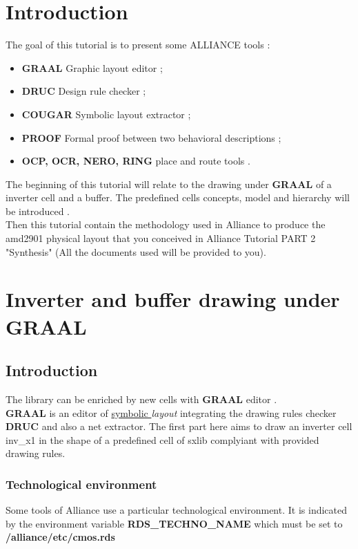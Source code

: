 \documentclass{article}
\begin{document}
\newpage

\section{Introduction}
 The goal of this tutorial is to present some ALLIANCE tools :
\begin{itemize}\itemsep=-.4ex
\item   {\bf GRAAL} Graphic layout editor ;
\item   {\bf DRUC} Design rule checker ;
\item   {\bf COUGAR} Symbolic layout extractor ;
\item   {\bf PROOF} Formal proof between two behavioral descriptions ;
\item   {\bf OCP, OCR, NERO, RING} place and route tools .
\end{itemize}

The beginning of this tutorial will relate to the drawing under {
\bf GRAAL } of a inverter cell and a buffer.
The predefined cells concepts, model and
hierarchy will be introduced .\\
Then this tutorial contain the methodology used in Alliance to produce
the amd2901 physical layout that you conceived in Alliance Tutorial 
PART 2 "Synthesis" (All the documents used will be provided to you).
 
\newpage

\section{Inverter and buffer drawing under GRAAL}

\subsection{Introduction}
    The library can be enriched by new cells with {\bf GRAAL} editor .\\
{ \bf GRAAL } is an editor of \/{\underline{symbolic }} {\it
layout} integrating the drawing rules checker {\bf DRUC} and also 
a net extractor.
 The first part here aims to draw an inverter cell inv\_x1 in the shape
of a predefined cell of sxlib complyiant with provided
drawing rules.

\subsubsection{Technological environment}
Some tools of Alliance use a particular technological
environment. It is indicated by the environment variable {\bf
RDS\_TECHNO\_NAME} which must be set to
{\bf/alliance/etc/cmos.rds}
\end{document}
